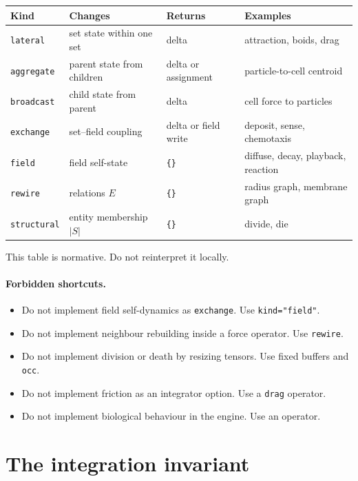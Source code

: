 \documentclass[11pt]{article}
\newcommand{\code}[1]{\texttt{#1}}
\begin{document}
\begin{center}
\renewcommand{\arraystretch}{1.2}
\footnotesize
\begin{tabular}{@{}llll@{}}
\toprule
\textbf{Kind} & \textbf{Changes} & \textbf{Returns} & \textbf{Examples} \\
\midrule
\code{lateral}    & set state within one set      & delta                & attraction, boids, drag \\
\code{aggregate}  & parent state from children    & delta or assignment  & particle-to-cell centroid \\
\code{broadcast}  & child state from parent       & delta                & cell force to particles \\
\code{exchange}   & set--field coupling           & delta or field write & deposit, sense, chemotaxis \\
\code{field}      & field self-state              & \code{\{\}}          & diffuse, decay, playback, reaction \\
\code{rewire}     & relations $E$                 & \code{\{\}}          & radius graph, membrane graph \\
\code{structural} & entity membership $|S|$       & \code{\{\}}          & divide, die \\
\bottomrule
\end{tabular}
\end{center}

This table is normative. Do not reinterpret it locally.

\paragraph{Forbidden shortcuts.}
\begin{itemize}\itemsep2pt
\item Do not implement field self-dynamics as \code{exchange}. Use \code{kind="field"}.
\item Do not implement neighbour rebuilding inside a force operator. Use \code{rewire}.
\item Do not implement division or death by resizing tensors. Use fixed buffers and \code{occ}.
\item Do not implement friction as an integrator option. Use a \code{drag} operator.
\item Do not implement biological behaviour in the engine. Use an operator.
\end{itemize}

\section{The integration invariant}
\end{document}
